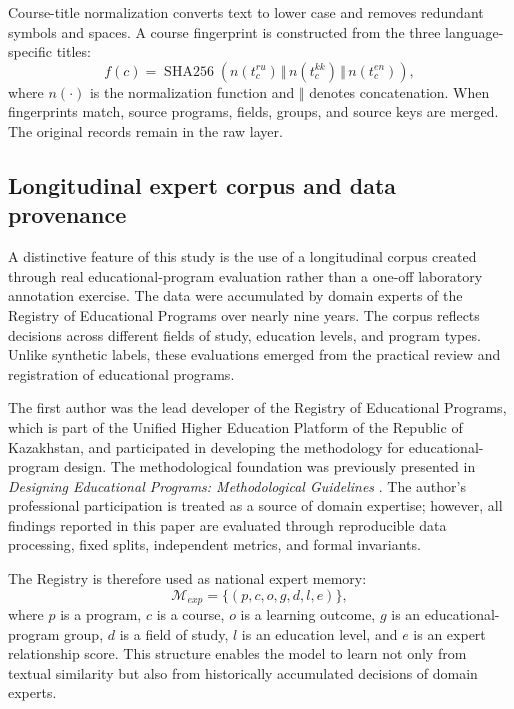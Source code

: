 \documentclass[twoside,11pt]{article}
\begin{document}
Course-title normalization converts text to lower case and removes redundant symbols and spaces. A course fingerprint is constructed from the three language-specific titles:
\begin{equation}
  f(c)=\operatorname{SHA256}\left(
  n(t_c^{ru})\,\Vert\,n(t_c^{kk})\,\Vert\,n(t_c^{en})
  \right),
  \label{eq:fingerprint}
\end{equation}
where $n(\cdot)$ is the normalization function and $\Vert$ denotes concatenation. When fingerprints match, source programs, fields, groups, and source keys are merged. The original records remain in the raw layer.

\subsection{Longitudinal expert corpus and data provenance}

A distinctive feature of this study is the use of a longitudinal corpus created through real educational-program evaluation rather than a one-off laboratory annotation exercise. The data were accumulated by domain experts of the Registry of Educational Programs over nearly nine years. The corpus reflects decisions across different fields of study, education levels, and program types. Unlike synthetic labels, these evaluations emerged from the practical review and registration of educational programs.

The first author was the lead developer of the Registry of Educational Programs, which is part of the Unified Higher Education Platform of the Republic of Kazakhstan, and participated in developing the methodology for educational-program design. The methodological foundation was previously presented in \textit{Designing Educational Programs: Methodological Guidelines} \cite{Ibatov2017}. The author's professional participation is treated as a source of domain expertise; however, all findings reported in this paper are evaluated through reproducible data processing, fixed splits, independent metrics, and formal invariants.

The Registry is therefore used as national expert memory:
\begin{equation}
  \mathcal{M}_{exp}=\{(p,c,o,g,d,l,e)\},
  \label{eq:expert-memory}
\end{equation}
where $p$ is a program, $c$ is a course, $o$ is a learning outcome, $g$ is an educational-program group, $d$ is a field of study, $l$ is an education level, and $e$ is an expert relationship score. This structure enables the model to learn not only from textual similarity but also from historically accumulated decisions of domain experts.
\end{document}
